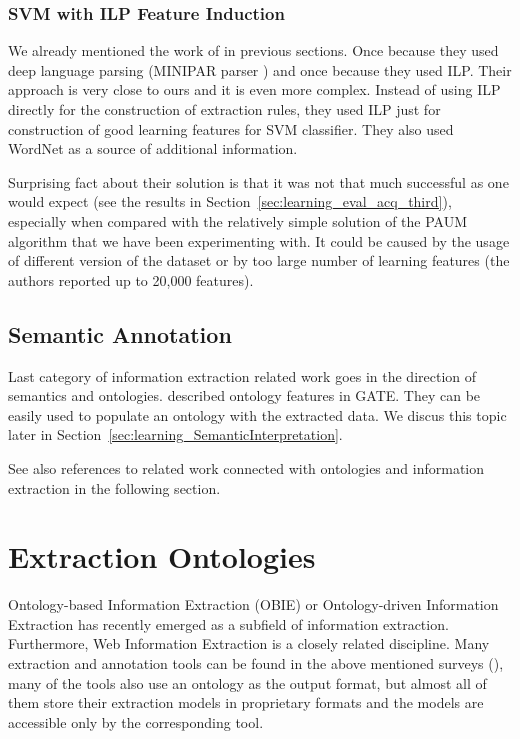 \subsubsection{SVM with ILP Feature Induction}

We already mentioned the work of \cite{DBLP:conf/ilp/RamakrishnanJBS07} in previous sections. Once because they used deep language parsing (MINIPAR parser \citep{minipar}) and once because they used ILP. Their approach is very close to ours and it is even more complex. Instead of using ILP directly for the construction of extraction rules, they used ILP just for construction of good learning features for SVM classifier. They also used WordNet as a source of additional information. 

Surprising fact about their solution is that it was not that much successful as one would expect (see the results in Section~\ref{sec:learning_eval_acq_third}), especially when compared with the relatively simple solution of the PAUM algorithm that we have been experimenting with. It could be caused by the usage of different version of the dataset or by too large number of learning features (the authors reported up to 20,000 features).


\subsection{Semantic Annotation}
Last category of information extraction related work goes in the direction of semantics and ontologies. \cite{Bon04b} described  ontology features in GATE. They can be easily used to populate an ontology with the extracted data. We discus this topic later in Section~\ref{sec:learning_SemanticInterpretation}.

See also references to related work connected with ontologies and information extraction in the following section. 


\section{Extraction Ontologies} \label{sec:relwork_ext_ont}

Ontology-based Information Extraction (OBIE) \citep{citeulike:7291004} or Ontology-driven Information Extraction \citep{Yildiz:2007:OMO:1793154.1793216} has recently emerged as a subfield of information extraction. Furthermore, Web Information Extraction \citep{biblio:Survey_of_Web_Information_Extraction_Systems} is a closely related discipline. Many extraction and annotation tools can be found in the above mentioned surveys (\citep{biblio:Survey_of_Web_Information_Extraction_Systems}), many of the tools also use an ontology as the output format, but almost all of them store their extraction models in proprietary formats and the models are accessible only by the corresponding tool.

